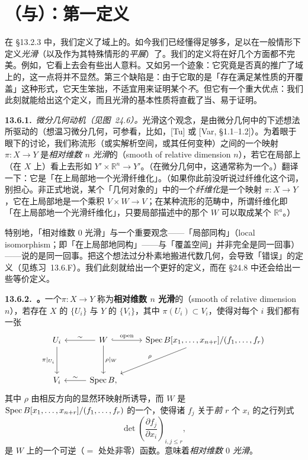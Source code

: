 
\section{\trSmooth{}（与\trEtale{}）\trMorphism：第一定义}

在 \S13.2.3 中，我们定义了域上的\trSmoothness。如今我们已经懂得足够多，足以在一般情形下定义\emph{光滑\trMorphism}（以及作为其特殊情形的\emph{平展\trMorphism}）了。我们的定义将在好几个方面都不完美。例如，它看上去会有些出人意料。又如另一个迹象：它究竟是否真的推广了域上的\trSmoothness，这一点将并不显然。第三个缺陷是：由于它取的是「存在满足某性质的开覆盖」这种形式，它天生笨拙，不适宜用来证明某个\trMorphism{}\emph{不}\trSmooth。但它有一个重大优点：我们此刻就能给出这个定义，而且光滑\trMorphism{}的基本性质将直截了当、易于证明。

\textbf{13.6.1.}\ \emph{微分几何动机（见\mbox{图~24.6}）。}\quad 光滑\trMorphism{}这个观念，是由微分几何中的下述想法所驱动的（想温习微分几何，可参看，比如，[Tu] 或 [Var, \S1.1--1.2]）。为着眼于眼下的讨论，我们称流形（或实解析空间，或其任何变种）之间的一个映射 $\pi\colon X\to Y$ 是\emph{相对维数 $n$ 光滑}的（smooth of relative dimension $n$），若它在局部上（在 $X$ 上）看上去形如 $Y'\times\mathbb{R}^n\to Y'$。（在微分几何中，这通常称为一个\trSubmersion。）翻译一下：它是「在\trSource{}上局部地一个光滑纤维化」。（如果你此前没听说过纤维化这个词，别担心。非正式地说，某个「几何对象的\trCategory」中的一个\emph{纤维化}是一个映射 $\pi\colon X\to Y$，它在\trSource{}上局部地是一个乘积 $V\times W\to V$；在某种流形的范畴中，所谓纤维化即「在\trSource{}上局部地一个光滑纤维化」，只要局部描述中的那个 $W$ 可以取成某个 $\mathbb{R}^a$。）

特别地，「相对维数 $0$ 光滑」与一个重要观念——「局部同构」（local isomorphism；即「在\trSource{}上局部地同构」——与「覆盖空间」并非完全是同一回事）——说的是同一回事。把这个想法过分朴素地搬进代数几何，会导致「错误」的定义（见\mbox{练习~13.6.F}）。我们此刻就给出一个更好的定义，而在 \S24.8 中还会给出一些等价定义。

\textbf{13.6.2.\ \trhDefinition{}。}\quad 一个\trMorphism $\pi\colon X\to Y$ 称为\textbf{相对维数 $n$ 光滑}的（smooth of relative dimension $n$），若存在 $X$ 的\trOpenCover{} $\{U_i\}$ 与 $Y$ 的\trOpenCover{} $\{V_i\}$，其中 $\pi(U_i)\subset V_i$，使得对每个 $i$ 我们都有一张\trCommutativeDiagram
\[
\begin{tikzcd}[row sep=3.2em, column sep=2.6em]
U_i \ar[d, "\pi|_{U_i}"'] & W \ar[l, "\sim"'] \ar[r, hook, "\text{open}"] \ar[d, "\rho|_W"] & \Spec B[x_1,\dots,x_{n+r}]/(f_1,\dots,f_r) \ar[dl, "\rho"'] \\
V_i & \Spec B, \ar[l, "\sim"'] &
\end{tikzcd}
\]
其中 $\rho$ 由相反方向的显然环映射所诱导，而 $W$ 是 $\operatorname{Spec} B[x_1,\dots,x_{n+r}]/(f_1,\dots,f_r)$ 的一个\trOpenSubscheme，使得诸 $f_j$ 关于\emph{前} $r$ 个 $x_i$ 的\trJacobianMatrix{}之行列式
\begin{equation*}\tag{13.6.2.1}\label{eq:jacobian-det}
\det\left(\frac{\partial f_j}{\partial x_i}\right)_{i,j\le r},
\end{equation*}
是 $W$ 上的一个可逆（$=$ 处处非零）函数。\textbf{\trEtale}意味着\emph{相对维数 $0$ 光滑}。

